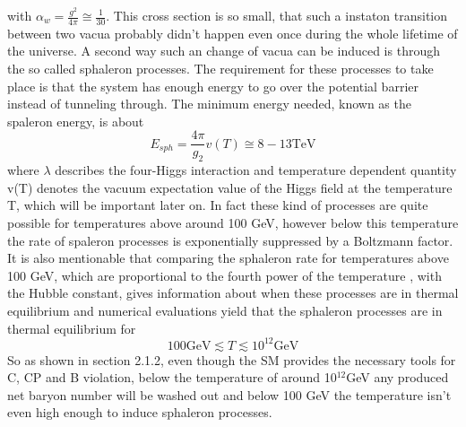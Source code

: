 with $\alpha_w=\frac{g^2}{4\pi}\cong\frac{1}{30}$.
This cross section is so small, that such a instaton transition between two vacua probably didn't happen even once during the whole lifetime of the universe. \newline
A second way such an change of vacua can be induced is through the so called sphaleron processes. The requirement for these processes to take place is that the system has enough energy to go over the potential barrier instead of tunneling through. The minimum energy needed, known as the spaleron energy, is about\cite{Bernreuther:2002uj,Cline:2006ts}
\begin{equation}
	E_{sph}=\frac{4\pi}{g_2}v(T)\cong8-13\text{TeV}
	\label{spaleron}
\end{equation} 
where $\lambda$ describes the four-Higgs interaction and temperature dependent quantity v(T) denotes the vacuum expectation value of the Higgs field at the temperature T, which will be important later on.\newline
In fact these kind of processes are quite possible for temperatures above around 100 GeV, however below this temperature the rate of spaleron processes is exponentially suppressed by a Boltzmann factor. It is also mentionable that comparing the sphaleron rate for temperatures above 100 GeV, which are proportional to the fourth power of the temperature \cite[p. 19]{Bernreuther:2002uj}, with the Hubble constant, gives information about when these processes are in thermal equilibrium and numerical evaluations yield that the sphaleron processes are in thermal equilibrium for
\begin{equation*}
100\text{GeV}\lesssim T \lesssim 10^{12}\text{GeV}
\end{equation*}
So as shown in section 2.1.2, even though the SM provides the necessary tools for C, CP and B violation, below the temperature of around 10$^{12}$GeV any produced net baryon number will be washed out and below 100 GeV the temperature isn't even high enough to induce sphaleron processes. \newline
